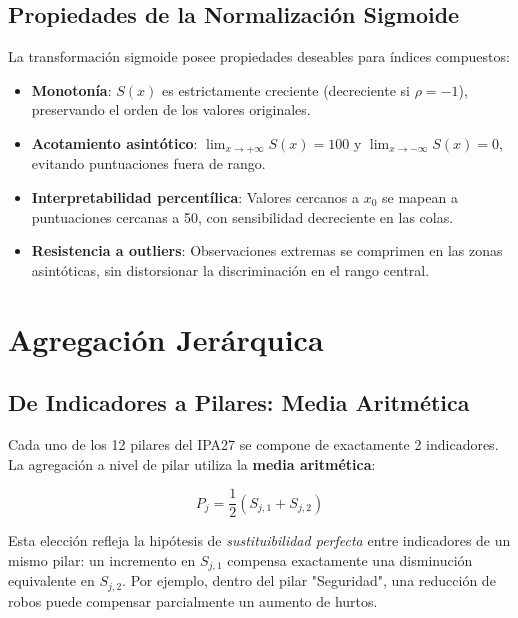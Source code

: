 \documentclass[authoryear,12pt]{elsarticle}
\begin{document}
\subsection{Propiedades de la Normalización Sigmoide}

La transformación sigmoide posee propiedades deseables para índices compuestos:

\begin{itemize}
    \item \textbf{Monotonía}: $S(x)$ es estrictamente creciente (decreciente si $\rho = -1$), preservando el orden de los valores originales.

    \item \textbf{Acotamiento asintótico}: $\lim_{x \to +\infty} S(x) = 100$ y $\lim_{x \to -\infty} S(x) = 0$, evitando puntuaciones fuera de rango.

    \item \textbf{Interpretabilidad percentílica}: Valores cercanos a $x_0$ se mapean a puntuaciones cercanas a 50, con sensibilidad decreciente en las colas.

    \item \textbf{Resistencia a outliers}: Observaciones extremas se comprimen en las zonas asintóticas, sin distorsionar la discriminación en el rango central.
\end{itemize}

\section{Agregación Jerárquica}

\subsection{De Indicadores a Pilares: Media Aritmética}

Cada uno de los 12 pilares del IPA27 se compone de exactamente 2 indicadores. La agregación a nivel de pilar utiliza la \textbf{media aritmética}:

\begin{equation}
P_j = \frac{1}{2} \left( S_{j,1} + S_{j,2} \right)
\end{equation}

Esta elección refleja la hipótesis de \textit{sustituibilidad perfecta} entre indicadores de un mismo pilar: un incremento en $S_{j,1}$ compensa exactamente una disminución equivalente en $S_{j,2}$. Por ejemplo, dentro del pilar "Seguridad", una reducción de robos puede compensar parcialmente un aumento de hurtos.
\end{document}
